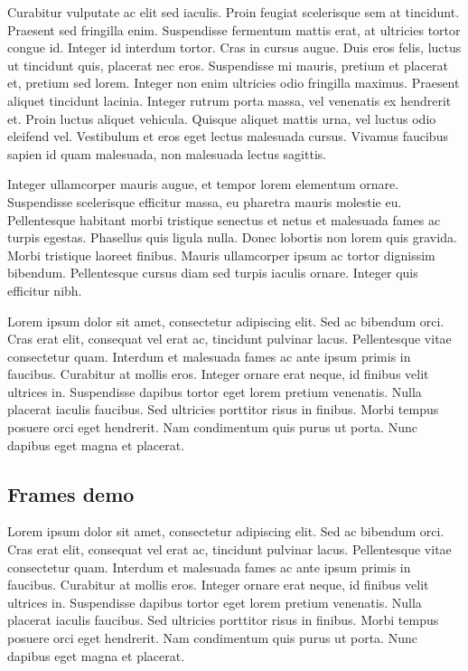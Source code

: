 \documentclass[./main.tex]{subfiles}
\begin{document}
\par Curabitur vulputate ac elit sed iaculis. Proin feugiat scelerisque sem at tincidunt. Praesent sed fringilla enim. Suspendisse fermentum mattis erat, at ultricies tortor congue id. Integer id interdum tortor. Cras in cursus augue. Duis eros felis, luctus ut tincidunt quis, placerat nec eros. Suspendisse mi mauris, pretium et placerat et, pretium sed lorem. Integer non enim ultricies odio fringilla maximus. Praesent aliquet tincidunt lacinia. Integer rutrum porta massa, vel venenatis ex hendrerit et. Proin luctus aliquet vehicula. Quisque aliquet mattis urna, vel luctus odio eleifend vel. Vestibulum et eros eget lectus malesuada cursus. Vivamus faucibus sapien id quam malesuada, non malesuada lectus sagittis. 

\par Integer ullamcorper mauris augue, et tempor lorem elementum ornare. Suspendisse scelerisque efficitur massa, eu pharetra mauris molestie eu. Pellentesque habitant morbi tristique senectus et netus et malesuada fames ac turpis egestas. Phasellus quis ligula nulla. Donec lobortis non lorem quis gravida. Morbi tristique laoreet finibus. Mauris ullamcorper ipsum ac tortor dignissim bibendum. Pellentesque cursus diam sed turpis iaculis ornare. Integer quis efficitur nibh.

\par Lorem ipsum dolor sit amet, consectetur adipiscing elit. Sed ac bibendum orci. Cras erat elit, consequat vel erat ac, tincidunt pulvinar lacus. Pellentesque vitae consectetur quam. Interdum et malesuada fames ac ante ipsum primis in faucibus. Curabitur at mollis eros. Integer ornare erat neque, id finibus velit ultrices in. Suspendisse dapibus tortor eget lorem pretium venenatis. Nulla placerat iaculis faucibus. Sed ultricies porttitor risus in finibus. Morbi tempus posuere orci eget hendrerit. Nam condimentum quis purus ut porta. Nunc dapibus eget magna et placerat.

\subsection{Frames demo}

\par Lorem ipsum dolor sit amet, consectetur adipiscing elit. Sed ac bibendum orci. Cras erat elit, consequat vel erat ac, tincidunt pulvinar lacus. Pellentesque vitae consectetur quam. Interdum et malesuada fames ac ante ipsum primis in faucibus. Curabitur at mollis eros. Integer ornare erat neque, id finibus velit ultrices in. Suspendisse dapibus tortor eget lorem pretium venenatis. Nulla placerat iaculis faucibus. Sed ultricies porttitor risus in finibus. Morbi tempus posuere orci eget hendrerit. Nam condimentum quis purus ut porta. Nunc dapibus eget magna et placerat.
\end{document}
